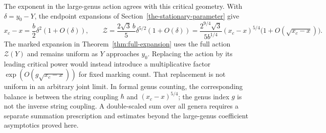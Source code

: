 The exponent in the large-genus action agrees with this critical
geometry. With $\delta=y_0-Y$, the endpoint
expansions of Section~\ref{the-stationary-parameter} give
\[
 x_c-x=\frac b2\delta^2(1+O(\delta)),\qquad
 \mathcal Z=\frac{2\sqrt3\,b}{5}\delta^{5/2}(1+O(\delta))
       =\frac{2^{9/4}\sqrt3}{5b^{1/4}}
          (x_c-x)^{5/4}\bigl(1+O(\sqrt{x_c-x})\bigr).
\]
The marked expansion in Theorem~\ref{thm:full-expansion} uses the
full action $\mathcal Z(Y)$ and remains uniform as $Y$ approaches
$y_0$. Replacing the action by its leading critical power would instead
introduce a multiplicative factor $\exp(O(g\sqrt{x_c-x}))$ for fixed
marking count. That replacement is not uniform in an arbitrary joint
limit. In formal genus counting, the corresponding balance is between
the string coupling $\hbar$ and $(x_c-x)^{5/4}$; the genus index $g$
is not the inverse string coupling. A double-scaled sum over all genera
requires a separate summation prescription and estimates beyond the
large-genus coefficient asymptotics proved here.
